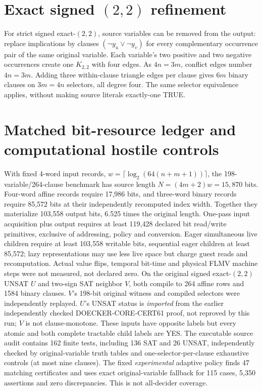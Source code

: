 \documentclass[11pt]{article}
\begin{document}
\section{Exact signed $(2,2)$ refinement}
For strict signed exact-$(2,2)$, source variables can be removed from the output: replace implications by clauses $(\neg y_u\vee\neg y_v)$ for every complementary occurrence pair of the same original variable. Each variable's two positive and two negative occurrences create one $K_{2,2}$ with four edges. As $4n=3m$, conflict edges number $4n=3m$. Adding three within-clause triangle edges per clause gives $6m$ binary clauses on $3m=4n$ selectors, all degree four. The same selector equivalence applies, without making source literals exactly-one TRUE.
\section{Matched bit-resource ledger and computational hostile controls}
With fixed 4-word input records, $w=\lceil\log_2(64(n+m+1))\rceil$, the 198-variable/264-clause benchmark has source length $N=(4m+2)w=15{,}870$ bits. Four-word affine records require 17,986 bits, and three-word binary records require 85,572 bits at their independently recomputed index width. Together they materialize 103,558 output bits, 6.525 times the original length. One-pass input acquisition plus output requires at least 119,428 declared bit read/write primitives, exclusive of addressing, policy and conversion. Eager simultaneous live children require at least 103,558 writable bits, sequential eager children at least 85,572; lazy representations may use less live space but charge guest reads and recomputation. Actual value flips, temporal bit-time and physical FLMV machine steps were not measured, not declared zero.
On the original signed exact-$(2,2)$ UNSAT $U$ and two-sign SAT neighbor $V$, both compile to 264 affine rows and 1584 binary clauses. $V$'s 198-bit original witness and compiled selectors were independently replayed. $U$'s UNSAT status is \emph{imported} from the earlier independently checked DOECKER-CORE-CERT61 proof, not reproved by this run; $V$ is not clause-monotone. These inputs have opposite labels but every atomic and both complete tractable child labels are YES. The executable source audit contains 162 finite tests, including 136 SAT and 26 UNSAT, independently checked by original-variable truth tables and one-selector-per-clause exhaustive controls (at most nine clauses). The fixed \emph{experimental} adaptive policy finds 47 matching certificates and uses exact original-variable fallback for 115 cases, 5,350 assertions and zero discrepancies. This is not all-decider coverage.
\end{document}
